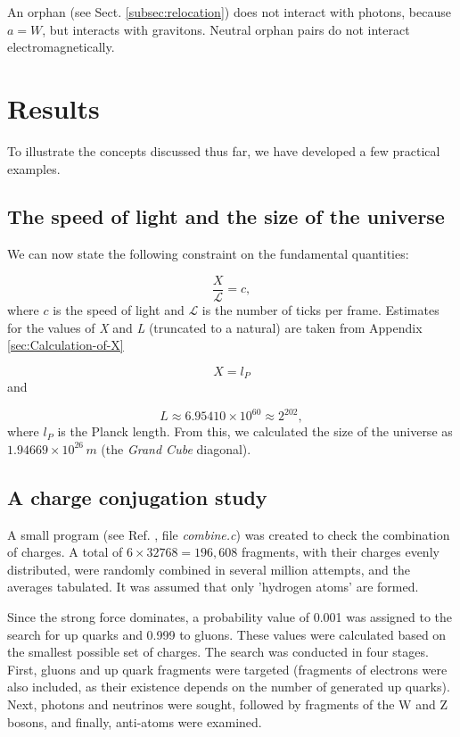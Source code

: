 \documentclass[12pt,english]{article}
\begin{document}
An orphan (see Sect. \ref{subsec:relocation}) does not interact with photons, because $a=W$, but interacts with gravitons. Neutral orphan pairs do not interact electromagnetically.


\section{Results}\label{sec:Results}

To illustrate the concepts discussed thus far, we have developed a few practical examples.

\subsection{The speed of light and the size of the universe}

We can now state the following constraint on the fundamental quantities:

\[
\frac{X}{\mathcal{L}}=c,
\]
where $c$ is the speed of light and $\mathcal{L}$ is the number of ticks per frame. Estimates for the values of \emph{X} and \emph{L }(truncated to a natural) are taken from Appendix \ref{sec:Calculation-of-X}

\[
X=l_{P}
\]
and

\[
L\approx6.95410\times10^{60}\approx2^{202},
\]
where $l_{P}$ is the Planck length. From this, we calculated the size of the universe as $1.94669\times10^{26}\,m$ (the \emph{Grand Cube} diagonal).

\subsection{A charge conjugation study}

A small program (see Ref. \cite{af_neto}, file \emph{combine.c}) was created to check the combination of charges. A total of $6\times32768=196,608$ fragments, with their charges evenly distributed, were randomly combined in several million attempts, and the averages tabulated. It was assumed that only 'hydrogen atoms' are formed.

Since the strong force dominates, a probability value of 0.001 was assigned to the search for up quarks and 0.999 to gluons. These values were calculated based on the smallest possible set of charges. The search was conducted in four stages. First, gluons and up quark fragments were targeted (fragments of electrons were also included, as their existence depends on the number of generated up quarks). Next, photons and neutrinos were sought, followed by fragments of the W and Z bosons, and finally, anti-atoms were examined.
\end{document}
